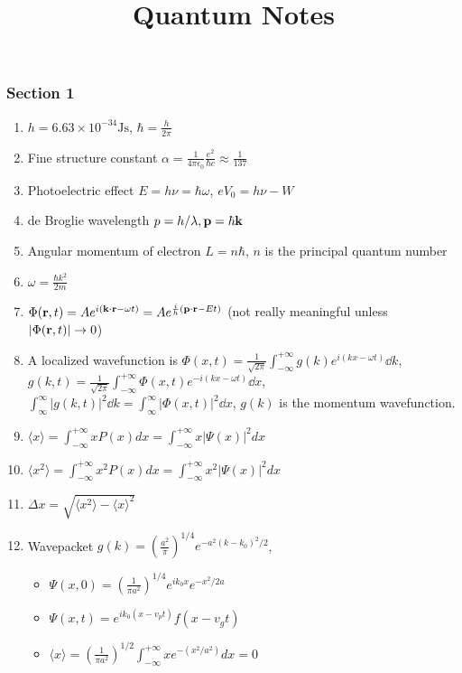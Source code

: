 \documentclass{article}
\theoremstyle{remark}
\theoremstyle{remark}
\begin{document}
\title{Quantum Notes}
\maketitle

\subsubsection*{Section 1}
\begin{enumerate}
    \item $h=6.63\times 10^{-34} \mathrm{Js}$, $\hbar=\frac{h}{2\pi}$
    \item Fine structure constant $\alpha=\frac{1}{4\pi\epsilon_0}\frac{e^2}{\hbar c}\approx\frac{1}{137}$
    \item Photoelectric effect $E=h\nu=\hbar\omega$, $eV_0=h\nu-W$
    \item de Broglie wavelength $p=h/\lambda, \vb{p}=\hbar\vb{k}$
    \item Angular momentum of electron $L=n\hbar$, $n$ is the principal quantum number
    \item $\omega=\frac{\hbar k^2}{2m}$
    \item $\Phi(\vb{r},t)=Ae^{i(\vb{k}\cdot\vb{r}-\omega t)} = Ae^{\frac{i}{h}(\vb{p}\cdot\vb{r}-Et)}$ (not really meaningful unless $|\Phi(\vb{r},t)|\rightarrow0$)
    \item A localized wavefunction is $\Phi(x,t)=\frac{1}{\sqrt{2\pi}}\int_{-\infty}^{+\infty} g(k)e^{i(kx-\omega t)}\dd k$, $g(k,t)=\frac{1}{\sqrt{2\pi}}\int_{-\infty}^{+\infty}\Phi(x,t)e^{-i(kx-\omega t)}\dd x$, $\int_\infty^\infty |g(k,t)|^2\dd k=\int_\infty^\infty |\Phi(x,t)|^2\dd x$, $g(k)$ is the momentum wavefunction.
    \item $\langle x\rangle=\int_{-\infty}^{+\infty}x P(x)d x=\int_{-\infty}^{+\infty}x|\Psi(x)|^{2}d x$
    \item $\langle x^{2}\rangle=\int_{-\infty}^{+\infty}x^{2}P(x)d x=\int_{-\infty}^{+\infty}x^{2}|\Psi(x)|^{2}d x$
    \item $\Delta x=\sqrt{\langle x^{2}\rangle-\langle x\rangle^{2}}$
    \item Wavepacket $g(k)=\left(\frac{a^2}{\pi}\right)^{1/4}e^{-a^2(k-k_0)^2/2}$, \begin{itemize}
        \item $\Psi(x,0)=\left(\frac{1}{\pi a^2}\right)^{1/4}e^{ik_0x}e^{-x^2/2a}$
        \item $\Psi(x,t)=e^{i k_{0}(x-v_{p}t)}f(x-v_{g}t)$
        \item $\langle x\rangle=\left(\frac{1}{\pi a^{2}}\right)^{1/2}\int_{-\infty}^{+\infty}x e^{-(x^{2}/a^{2})}d x=0$

\end{itemize}
\end{enumerate}
\end{document}

